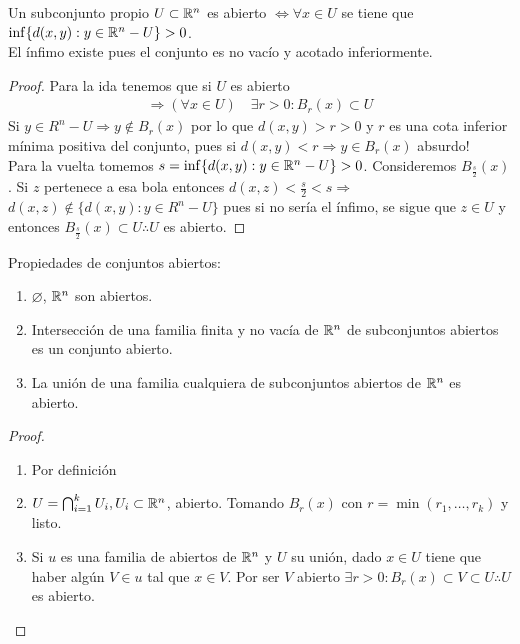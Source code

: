 \begin{prop}
  Un subconjunto propio \(U \subset \mathbb{R}^n\) es abierto \(\iff \forall x \in U\) se tiene que \( \inf \{d(x, y) : y \in \mathbb{R}^n - U\} > 0\). \\
  El ínfimo existe pues el conjunto es no vacío y acotado inferiormente.
  \begin{proof}
    Para la ida tenemos que si \(U\) es abierto
    \begin{align*}
      \Rightarrow (\forall x \in U) \quad \exists r > 0 : B_r(x) \subset U
    \end{align*}
    Si \(y \in R^n - U \Rightarrow y \notin B_r(x)\) por lo que \(d(x, y) > r > 0\) y \(r\) es una cota inferior mínima positiva del conjunto, pues si \(d(x,y) < r \Rightarrow y \in B_r(x)\) absurdo! \\

    Para la vuelta tomemos \(s = \inf \{ d(x,y) : y \in \mathbb{R}^n - U \} > 0\). Consideremos \(B_{\frac{s}{2}}(x)\). Si \(z\) pertenece a esa bola entonces \(d(x, z) < \frac{s}{2} < s \Rightarrow \) \\
    \(d(x, z) \notin \{ d(x,y) : y \in R^n - U \} \) pues si no sería el ínfimo, se sigue que \(z \in U\) y entonces \(B_{\frac{s}{2}}(x) \subset U \therefore U\) es abierto.
  \end{proof}
\end{prop}

\begin{prop}
  Propiedades de conjuntos abiertos:
  \begin{enumerate}
    \item \(\varnothing \), \(\mathbb{R}^n\) son abiertos.
    \item Intersección de una familia finita y no vacía de \(\mathbb{R}^n\) de subconjuntos abiertos es un conjunto abierto.
    \item La unión de una familia cualquiera de subconjuntos abiertos de \(\mathbb{R}^n\) es abierto.
  \end{enumerate}
  \begin{proof}
    \begin{enumerate}
      \item Por definición
      \item \(U = \bigcap_{i = 1}^k U_i, U_i \subset \mathbb{R}^n\), abierto. Tomando \(B_r(x)\) con \(r = \min(r_1, \ldots, r_k)\) y listo.
      \item Si \(u\) es una familia de abiertos de \(\mathbb{R}^n\) y \(U\) su unión, dado \(x \in U\) tiene que haber algún \(V \in u\) tal que \(x \in V\). Por ser \(V\) abierto \(\exists r > 0 : B_r(x) \subset V \subset U \therefore U\) es abierto.
    \end{enumerate}
  \end{proof}
\end{prop}

